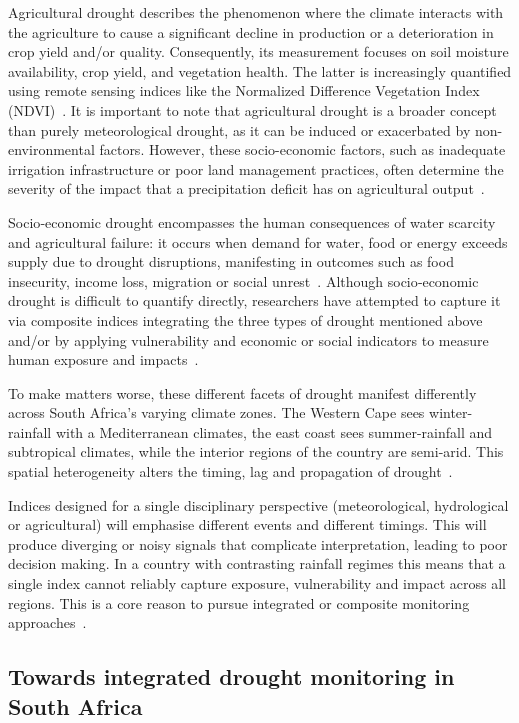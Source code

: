 Agricultural drought describes the phenomenon where the climate interacts with the agriculture to cause a significant decline in production or a deterioration in crop yield and/or quality. Consequently, its measurement focuses on soil moisture availability, crop yield, and vegetation health. The latter is increasingly quantified using remote sensing indices like the Normalized Difference Vegetation Index (NDVI)~\cite{judith2025remote}. It is important to note that agricultural drought is a broader concept than purely meteorological drought, as it can be induced or exacerbated by non-environmental factors. However, these socio-economic factors, such as inadequate irrigation infrastructure or poor land management practices, often determine the severity of the impact that a precipitation deficit has on agricultural output~\cite{Maracchi2000}.

Socio‐economic drought encompasses the human consequences of water scarcity and agricultural failure: it occurs when demand for water, food or energy exceeds supply due to drought disruptions, manifesting in outcomes such as food insecurity, income loss, migration or social unrest~\cite{w17071002}. Although socio‐economic drought is difficult to quantify directly, researchers have attempted to capture it via composite indices integrating the three types of drought mentioned above and/or by applying vulnerability and economic or social indicators to measure human exposure and impacts~\cite{WANG2022131248,Mehran+etAll}.

To make matters worse, these different facets of drought manifest differently across South Africa’s varying climate zones. The Western Cape sees winter-rainfall with a Mediterranean climates, the east coast sees summer-rainfall and subtropical climates, while the interior regions of the country are semi-arid. This spatial heterogeneity alters the timing, lag and propagation of drought~\cite{za_drought_review2, mulenga}.

Indices designed for a single disciplinary perspective (meteorological, hydrological or agricultural) will emphasise different events and different timings. This will produce diverging or noisy signals that complicate interpretation, leading to poor decision making. In a country with contrasting rainfall regimes this means that a single index cannot reliably capture exposure, vulnerability and impact across all regions. This is a core reason to pursue integrated or composite monitoring approaches~\cite{Drought.gov}. 


\subsection{Towards integrated drought monitoring in South Africa}

